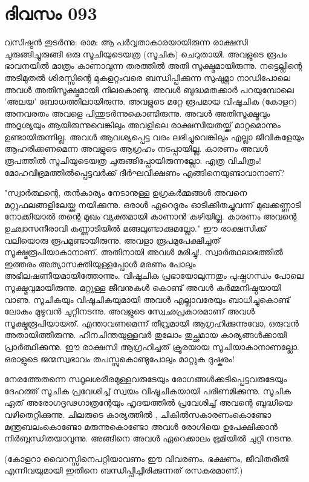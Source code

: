  
\section{ദിവസം 093}


വസിഷ്ഠന്‍ തുടര്‍ന്നു: രാമ: ആ പര്‍വ്വതാകാരയായിരുന്ന രാക്ഷസി ചുരുങ്ങിച്ചുരുങ്ങി ഒരു സൂചിയുടെയത്ര (സൂചിക) ചെറുതായി. അവളുടെ രൂപം ഭാവനയില്‍ മാത്രം കാണാവുന്ന തരത്തില്‍ അതി സൂക്ഷ്മമായിരുന്നു. നട്ടെല്ലിന്റെ അടിമുതല്‍ ശിരസ്സിന്റെ മുകളറ്റംവരെ ബന്ധിപ്പിക്കുന്ന സുഷുമ്നാ നാഡിപോലെ അവള്‍ അതിസൂക്ഷ്മമായി നിലകൊണ്ടു. അവള്‍ ബുദ്ധമതക്കാര്‍ പറയുമ്പോലെ 'അലയ' ബോധത്തിലായിരുന്നു. അവളുടെ മറ്റേ രൂപമായ വിഷൂചിക (കോളറ) അനവരതം അവളെ പിന്തുടര്‍ന്നുകൊണ്ടിരുന്നു. അവള്‍ അതിസൂക്ഷ്മവും അദൃശ്യയും ആയിരുന്നുവെങ്കിലും അവളിലെ രാക്ഷസീയതയ്ക്ക്‌ മാറ്റമൊന്നും ഉണ്ടായിരുന്നില്ല. അവള്‍ ആവശ്യപ്പെട്ട വരം ലഭിച്ചുവെങ്കിലും എല്ലാ ജീവികളേയും ആഹരിക്കണമെന്ന അവളുടെ ആഗ്രഹം നടപ്പായില്ല. കാരണം അവള്‍ രൂപത്തില്‍ സൂചിയുടെയത്ര ചുരുങ്ങിപ്പോയിരുന്നല്ലോ. എത്ര വിചിത്രം! മോഹവിഭ്രമത്തില്‍പ്പെട്ടവര്‍ക്ക്‌ ദീര്‍ഘവീക്ഷണം എങ്ങിനെയുണ്ടാവാനാണ്‌?

"സ്വാര്‍ത്ഥന്റെ, തന്‍കാര്യം നേടാനുള്ള ഉഗ്രകര്‍മ്മങ്ങള്‍ അവനെ മറ്റുഫലങ്ങളിലേയ്ക്കു നയിക്കുന്നു. ഒരാള്‍ ഏറെദൂരം ഓടിക്കിതച്ചുവന്ന് മുഖക്കണ്ണാടി നോക്കിയാല്‍ തന്റെ മുഖം വ്യക്തമായി കാണാന്‍ കഴിയില്ല. കാരണം അവന്റെ ഉഛ്വാസനീരാവി കണ്ണാടിയില്‍ മങ്ങലുണ്ടാക്കുമല്ലോ." ഈ രാക്ഷസിക്ക്‌ വലിയൊരു രൂപമുണ്ടായിരുന്നു. അവളാ രൂപമുപേക്ഷിച്ചത്‌ സൂക്ഷ്മരൂപിയാകാനാണ്‌. അതിനായി അവള്‍ മരിച്ചു!. സ്വാര്‍ത്ഥലാഭത്തില്‍ ഇത്തരം അത്യാസക്തിയുള്ളപ്പോള്‍ മരണം പോലും അഭിലഷണീയമായിത്തോന്നും. വിഷൂചിക പ്രഭായോലുന്നതും പുഷ്പഗന്ധം പോലെ സൂക്ഷ്മവുമായിരുന്നു. മറ്റുള്ള ജീവനുകള്‍ കൊണ്ട്‌ അവള്‍ കര്‍മ്മനിഷ്ഠയായി വാണു. സൂചികയും വിഷൂചികയുമായി അവള്‍ എല്ലാവരേയും ബാധിച്ചുകൊണ്ട്‌ ലോകം മുഴുവന്‍ ചുറ്റിനടന്നു. അവളുടെ സ്വേഛപ്രകാരമാണ്‌ അവള്‍ സൂക്ഷ്മരൂപിയായത്‌. എന്താവണമെന്ന് തീവ്രമായി ആഗ്രഹിക്കുന്നുവോ, ഒരുവന്‍ അതായിത്തീരുന്നു. ഹീനചിന്തയുള്ളവര്‍ തുലോം തുച്ഛമായ കാര്യങ്ങള്‍ക്കായി പ്രാര്‍ത്ഥിക്കുന്നു. ഈ രാക്ഷസി ആഗ്രഹിച്ചത്‌ ക്രൂരയായ സൂചിയാകാനാണല്ലോ. ഒരാളുടെ ജന്മസ്വഭാവം തപസ്സുകൊണ്ടുപോലും മാറ്റുക ദുഷ്കരം!

നേരത്തേതന്നെ സ്ഥൂലശരീരമുള്ളവരുടേയും രോഗങ്ങള്‍ക്കടിപ്പെട്ടവരുടേയും ദേഹത്ത്‌ സൂചിക പ്രവേശിച്ച്‌ സ്വയം വിഷൂചികയായി പരിണമിക്കുന്നു. സൂചിക ഏത്‌ അരോഗദൃഢഗാത്രന്റേയും ഹൃദയത്തില്‍ പ്രവേശിച്ച്‌ അവന്റെ ബുദ്ധിയെ വഴിതെറ്റിക്കുന്നു. ചിലരുടെ കാര്യത്തില്‍ , ചികില്‍സകാരണംകൊണ്ടോ മന്ത്രബലംകൊണ്ടോ മരുന്നുകൊണ്ടോ അവള്‍ രോഗിയെ ഉപേക്ഷിക്കാന്‍ നിര്‍ബ്ബന്ധിതയാവുന്നു. അങ്ങിനെ അവള്‍ ഏറെക്കാലം ഭൂമിയില്‍ ചുറ്റി നടന്നു.

(കോളറാ വൈറസ്സിനെപറ്റിയാവണം ഈ വിവരണം. ഭക്ഷണം, ജീവിതരീതി എന്നിവയുമായി ഇതിനെ ബന്ധിപ്പിച്ചിരിക്കുന്നത്‌ രസകരമാണ്‌.)
